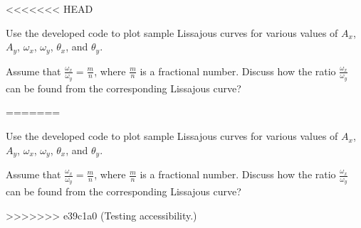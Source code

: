 \documentclass[11pt]{article}
\begin{document}
\begin{question}

<<<<<<< HEAD

\begin{subquestion}{Use the developed code to plot sample Lissajous curves for various values of $A_x$, $A_y$, $\omega_x$, $\omega_y$, $\theta_x$, and $\theta_y$. } 
\answer{}
\end{subquestion}

\begin{subquestion}{Assume that $\frac{\omega_x}{\omega_y}=\frac{m}{n}$, where $\frac{m}{n}$ is a fractional number. Discuss how the ratio $\frac{\omega_x}{\omega_y}$ can be found from the corresponding Lissajous curve?} 
\answer{}
\end{subquestion}
=======

    \begin{subquestion}{Use the developed code to plot sample Lissajous curves for various values of $A_x$, $A_y$, $\omega_x$, $\omega_y$, $\theta_x$, and $\theta_y$. }
        \answer{}
    \end{subquestion}

    \begin{subquestion}{Assume that $\frac{\omega_x}{\omega_y}=\frac{m}{n}$, where $\frac{m}{n}$ is a fractional number. Discuss how the ratio $\frac{\omega_x}{\omega_y}$ can be found from the corresponding Lissajous curve?}
        \answer{}
    \end{subquestion}
>>>>>>> e39c1a0 (Testing accessibility.)

\end{question}


\end{document}
